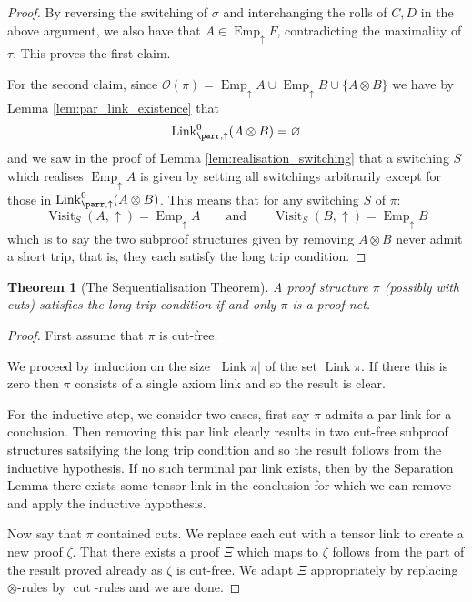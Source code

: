 \documentclass[12pt]{article}
\theoremstyle{plain}
\newtheorem{thm}{Theorem}[subsection] %
\theoremstyle{definition}
\newcommand{\call}[1]{\mathcal{#1}}
\begin{document}
\begin{proof}
		By reversing the switching of $\sigma$ and interchanging the rolls of $C,D$ in the above argument, we also have that $A \in \operatorname{Emp}_{\uparrow}F$, contradicting the maximality of $\tau$. This proves the first claim.
		
		For the second claim, since $\call{O}(\pi) = \operatorname{Emp}_{\uparrow}A \cup \operatorname{Emp}_{\uparrow}B \cup \lbrace A \otimes B\rbrace$ we have by Lemma \ref{lem:par_link_existence} that
		\begin{equation}
			\operatorname{Link}_{\parr,\uparrow}^0(A\otimes B) = \varnothing
		\end{equation}
		and we saw in the proof of Lemma \ref{lem:realisation_switching} that a switching $S$ which realises $\operatorname{Emp}_{\uparrow}A$ is given by setting all switchings arbitrarily except for those in $\operatorname{Link}_{\parr,\uparrow}^0(A\otimes B)$. This means that for any switching $S$ of $\pi$:
		\begin{equation}
			\operatorname{Visit}_{S}(A,\uparrow) = \operatorname{Emp}_{\uparrow}A \qquad\text{and}\qquad \operatorname{Visit}_{S}(B,\uparrow) = \operatorname{Emp}_{\uparrow}B
		\end{equation}
		which is to say the two subproof structures given by removing $A \otimes B$ never admit a short trip, that is, they each satisfy the long trip condition.
	\end{proof}
	\begin{thm}[The Sequentialisation Theorem]\label{thm:sequentialisation}
		A proof structure $\pi$ (possibly with cuts) satisfies the long trip condition if and only $\pi$ is a proof net.
	\end{thm}
	\begin{proof}
		First assume that $\pi$ is cut-free.
		
		We proceed by induction on the size $|\operatorname{Link}\pi|$ of the set $\operatorname{Link}\pi$. If there this is zero then $\pi$ consists of a single axiom link and so the result is clear.
		
		For the inductive step, we consider two cases, first say $\pi$ admits a par link for a conclusion. Then removing this par link clearly results in two cut-free subproof structures satsifying the long trip condition and so the result follows from the inductive hypothesis. If no such terminal par link exists, then by the Separation Lemma there exists some tensor link in the conclusion for which we can remove and apply the inductive hypothesis.
		
		Now say that $\pi$ contained cuts. We replace each cut with a tensor link to create a new proof $\zeta$. That there exists a proof $\Xi$ which maps to $\zeta$ follows from the part of the result proved already as $\zeta$ is cut-free. We adapt $\Xi$ appropriately by replacing $\otimes$-rules by $\operatorname{cut}$-rules and we are done.
	\end{proof}
\end{document}
